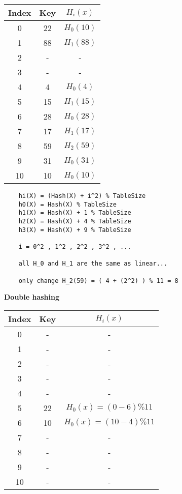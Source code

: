 \documentclass[11pt]{article}
\begin{document}
\begin{center}
\begin{tabular}{|c c c |} 
 \hline
 Index & Key & $H_i(x)$ \\ 
 \hline\hline
 0 & 22 &  $H_0(10)$ \\ 
\hline
 1 & 88 & $H_1(88)$ \\ 
 \hline
 2 & - & -  \\ 
 \hline
 3 & - & -  \\ 
 \hline
 4 & 4 & $H_0(4)$  \\ 
 \hline
 5 & 15 & $H_1(15)$  \\
  \hline
6 & 28 & $H_0(28)$  \\ 
 \hline
 7 & 17 & $H_1(17)$  \\ 
 \hline
 8 & 59 & $H_2(59)$   \\ 
 \hline
 9 & 31 & $H_0(31)$  \\
  \hline
10 & 10 & $H_0(10)$  \\
  \hline
\end{tabular}
\end{center}
\begin{verbatim}
    hi(X) = (Hash(X) + i^2) % TableSize
    h0(X) = Hash(X) % TableSize
    h1(X) = Hash(X) + 1 % TableSize
    h2(X) = Hash(X) + 4 % TableSize
    h3(X) = Hash(X) + 9 % TableSize

    i = 0^2 , 1^2 , 2^2 , 3^2 , ... 

    all H_0 and H_1 are the same as linear...

    only change H_2(59) = ( 4 + (2^2) ) % 11 = 8 

\end{verbatim}
\bigskip
\textbf{Double hashing}
\begin{center}
\begin{tabular}{|c c c |} 
 \hline
 Index & Key & $H_i(x)$ \\ 
 \hline\hline
 0 &  - &  - \\ 
\hline
 1 & - & - \\ 
 \hline
 2 & - & -  \\ 
 \hline
 3 & - & -  \\ 
 \hline
 4 & - & -  \\ 
 \hline
 5 & 22 &  $H_0(x)= (0-6) \% 11$  \\
  \hline
6 & 10 &  $H_0(x)= (10-4) \% 11$\\ 
 \hline
 7 & - & -  \\ 
 \hline
 8 & - & -   \\ 
 \hline
 9 & - & -  \\
  \hline
10 & - & -  \\
  \hline
\end{tabular}
\end{center}
\end{document}
